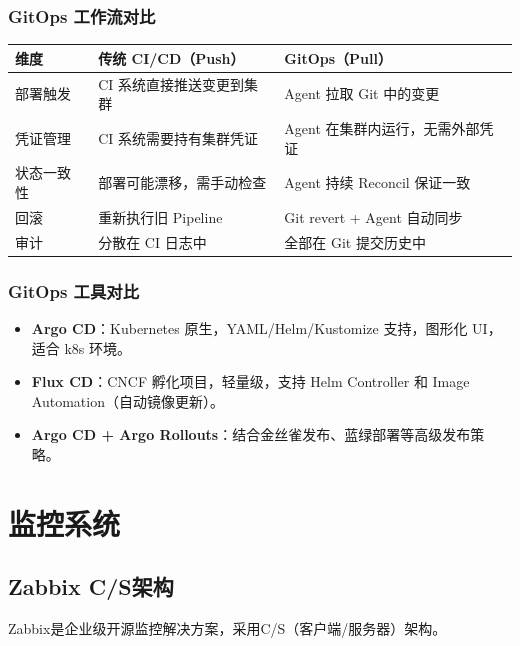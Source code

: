 \documentclass[12pt,UTF8]{ctexbook}
\begin{document}
\subsection*{GitOps 工作流对比}

\begin{tabular}{|p{3cm}|p{4cm}|p{4cm}|}
\hline
\textbf{维度} & \textbf{传统 CI/CD（Push）} & \textbf{GitOps（Pull）} \\
\hline
部署触发 & CI 系统直接推送变更到集群 & Agent 拉取 Git 中的变更 \\
\hline
凭证管理 & CI 系统需要持有集群凭证 & Agent 在集群内运行，无需外部凭证 \\
\hline
状态一致性 & 部署可能漂移，需手动检查 & Agent 持续 Reconcil 保证一致 \\
\hline
回滚 & 重新执行旧 Pipeline & Git revert + Agent 自动同步 \\
\hline
审计 & 分散在 CI 日志中 & 全部在 Git 提交历史中 \\
\hline
\end{tabular}

\subsection*{GitOps 工具对比}

\begin{itemize}
    \item \textbf{Argo CD}：Kubernetes 原生，YAML/Helm/Kustomize 支持，图形化 UI，适合 k8s 环境。
    \item \textbf{Flux CD}：CNCF 孵化项目，轻量级，支持 Helm Controller 和 Image Automation（自动镜像更新）。
    \item \textbf{Argo CD + Argo Rollouts}：结合金丝雀发布、蓝绿部署等高级发布策略。
\end{itemize}

\chapter{监控系统}
\label{chap:monitoring}

\section{Zabbix C/S架构}
\label{sec:zabbix-architecture}

Zabbix是企业级开源监控解决方案，采用C/S（客户端/服务器）架构。
\end{document}
